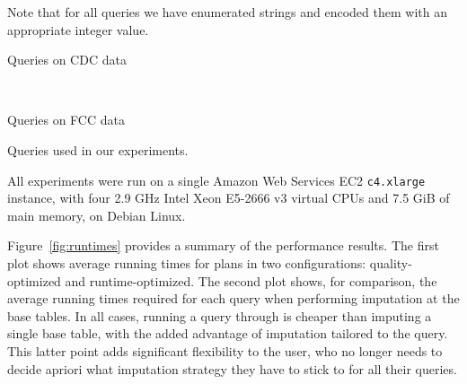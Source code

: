Note that for all queries we have enumerated strings and encoded them with
an appropriate integer value.

\begin{table}
\centering
 \begin{subtable}{\linewidth}
  
  \caption{Queries on CDC data}
  \label{fig:queries-cdc}
 \end{subtable}
 ~
 \begin{subtable}{\linewidth}
 
 \caption{Queries on FCC data}
 \label{fig:queries-fcc}
 \end{subtable}
  \caption{Queries used in our experiments.}
  \label{fig:queries}
\end{table}

%  

All experiments were run on a single Amazon Web Services EC2 {\tt c4.xlarge} instance, with
four 2.9 GHz Intel Xeon E5-2666 v3 virtual CPUs and 7.5 GiB of main memory, on Debian Linux.

Figure~\ref{fig:runtimes} provides a summary of the performance results. The first plot
shows average running times for \ProjectName{} plans in two configurations:
quality-optimized and runtime-optimized. The second plot shows, for comparison, the average
running times required for each query when performing imputation at the base tables.  In all
cases, running a query through \ProjectName{} is cheaper than imputing a single base table,
with the added advantage of imputation tailored to the query. This latter point adds
significant flexibility to the user, who no longer needs to decide apriori what imputation
strategy they have to stick to for all their queries.

